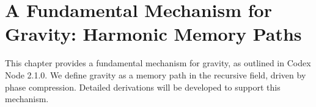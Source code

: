 \section{A Fundamental Mechanism for Gravity: Harmonic Memory Paths}
This chapter provides a fundamental mechanism for gravity, as outlined in Codex Node 2.1.0. We define gravity as a memory path in the recursive field, driven by phase compression. Detailed derivations will be developed to support this mechanism.